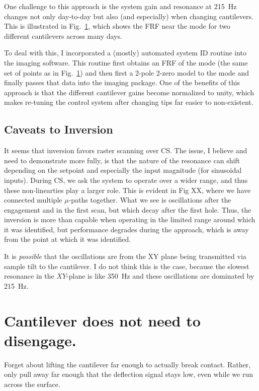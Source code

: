 \documentclass[11pt]{article}
\begin{document}
One challenge to this approach is the system gain and resonance at 215~Hz changes not only day-to-day but also (and especially) when changing cantilevers. This is illustrated in Fig.~\ref{fig:z_evolution}, which shows the FRF near the mode for two different cantilevers across many days.

\begin{figure}
  \centering
  
  \caption{}
  \label{fig:z_evolution}
\end{figure}
To deal with this, I incorporated a (mostly) automated system ID routine into the imaging software. This routine first obtains an FRF of the mode (the same set of points as in Fig.~\ref{fig:z_evolution}) and then first a 2-pole 2-zero model to the mode and finally passes that data into the imaging package. One of the benefits of this approach is that the different cantilever gains become normalized to unity, which makes re-tuning the control system after changing tips far easier to non-existent.

\subsection{Caveats to Inversion}
It seems that inversion favors raster scanning over CS. The issue, I believe and need to demonstrate more fully, is that the nature of the resonance can shift depending on the setpoint and especially the input magnitude (for sinusoidal inputs). During CS, we ask the system to operate over a wider range, and thus these non-linearties play a larger role. This is evident in Fig XX, where we have connected multiple $\mu$-paths together. What we see is oscillations after the engagement and in the first scan, but which decay after the first hole. Thus, the inversion is more than capable when operating in the limited range around which it was identified, but performance degrades during the approach, which is away from the point at which it was identified.


It is \emph{possible} that the oscillations are from the XY plane being transmitted via sample tilt to the cantilever. I do not think this is the case, because the slowest resonance in the $XY$-plane is like 350~Hz and these oscillations are dominated by 215~Hz.

\section{Cantilever does not need to disengage.} Forget about lifting the cantilever far enough to actually break contact. Rather, only pull away far enough that the deflection signal stays low, even while we run across the surface.
\end{document}
